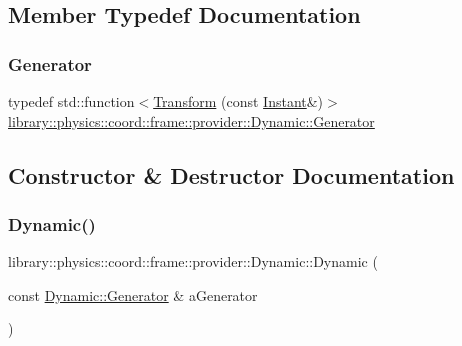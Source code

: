 \subsection{Member Typedef Documentation}
\mbox{\label{classlibrary_1_1physics_1_1coord_1_1frame_1_1provider_1_1_dynamic_a143db93d5b57faf0e91a812f4203a630}} 
\subsubsection{\texorpdfstring{Generator}{Generator}}
{\footnotesize\ttfamily typedef std\+::function$<$\hyperlink{classlibrary_1_1physics_1_1coord_1_1_transform}{Transform} (const \hyperlink{classlibrary_1_1physics_1_1time_1_1_instant}{Instant}\&)$>$ \hyperlink{classlibrary_1_1physics_1_1coord_1_1frame_1_1provider_1_1_dynamic_a143db93d5b57faf0e91a812f4203a630}{library\+::physics\+::coord\+::frame\+::provider\+::\+Dynamic\+::\+Generator}}



\subsection{Constructor \& Destructor Documentation}
\mbox{\label{classlibrary_1_1physics_1_1coord_1_1frame_1_1provider_1_1_dynamic_a9969003390848043b95d6ee4f451eade}} 
\subsubsection{\texorpdfstring{Dynamic()}{Dynamic()}}
{\footnotesize\ttfamily library\+::physics\+::coord\+::frame\+::provider\+::\+Dynamic\+::\+Dynamic (\begin{DoxyParamCaption}\item[{const \hyperlink{classlibrary_1_1physics_1_1coord_1_1frame_1_1provider_1_1_dynamic_a143db93d5b57faf0e91a812f4203a630}{Dynamic\+::\+Generator} \&}]{a\+Generator }\end{DoxyParamCaption})}

